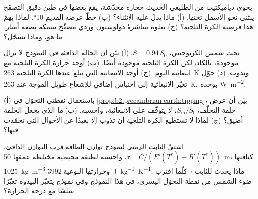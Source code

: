 \begin{exercise}[$\star\star$]\label{exo:b2:precambrian-earth:9}
يحوي دياميكتيت من الطليعي الحديث حجارة مخدّشة، يقع بعضها في طين دقيق التصفّح
ينثني نحو الأسفل تحتها. (أ) ماذا يدلّ عليه الانثناء؟ (ب) خطّ عرضه القديم
\ang{10}. لماذا يهمّ هذا فرضية الكرة الثلجية؟ (ج) يعلوه مباشرةً
دولوستون وردي مصفّح سمكه بضعة أمتار. ما هو، وماذا يسجّل؟
\end{exercise}

\begin{exercise}[$\star\star\star$]\label{exo:b2:precambrian-earth:10}
تحت شمس الكريوجيني، $S = 0.94\,S_0$. (أ) بيّن أن الحالة الدافئة في النموذج لا تزال
موجودة، بالكاد، لكن الكرة الثلجية موجودة أيضًا. (ب) أوجد حرارة الكرة الثلجية مع
انبعاثية اليوم. (ج) أوجد الانبعاثية التي تبلغ عندها الكرة الثلجية \qty{263}{K}
وتذوب. (د) حوّل تغيّر الانبعاثية إلى احتباس إضافي للإشعاع طويل الموجة عند
\qty{263}{K}، بوحدة \unit{W.m^{-2}}.
\end{exercise}

\begin{exercise}[$\star\star\star$]\label{exo:b2:precambrian-earth:11}
(أ) باستعمال نقطتي التحوّل في \cref{prop:b2:precambrian-earth:tipping}، بيّن أن عرض
حلقة التخلّف، $S_{\text{m}}/S_{\text{f}}$، لا يتوقّف على الانبعاثية،
واحسبه. (ب) ما الذي يجعل الحلقة أضيق؟ (ج) لماذا لا تستطيع الكرة الثلجية أن تذوب إلا بعيدًا عن
الأحوال التي تجمّدت فيها؟
\end{exercise}

\begin{exercise}[$\star\star\star$]\label{exo:b2:precambrian-earth:12}
اشتقّ الثابت الزمني لنموذج توازن الطاقة قرب التوازن الدافئ، $\tau =
C/(E'(T^*) - R'(T^*))$، واحسبه لطبقة محيطية مختلطة عمقها \qty{50}{m}، كثافتها
\qty{1025}{kg.m^{-3}} وحرارتها النوعية \qty{3992}{J.kg^{-1}.K^{-1}}. ماذا يحدث للثابت $\tau$ كلّما
اقترب ضوء الشمس من نقطة التحوّل اليسرى، في هذا النموذج وفي نموذج يتغيّر ألبيدوه
تغيّرًا سلسًا مع درجة الحرارة؟
\end{exercise}

